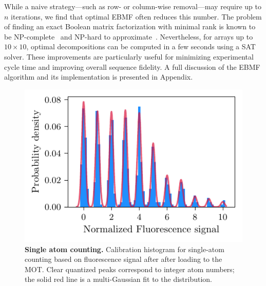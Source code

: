 While a naive strategy—such as row- or column-wise removal—may require up to $n$ iterations, we find that optimal EBMF often reduces this number. The problem of finding an exact Boolean matrix factorization with minimal rank is known to be NP-complete~\cite{orlin_contentment_1977} and NP-hard to approximate~\cite{gruber_inapproximability_2007}. Nevertheless, for arrays up to $10 \times 10$, optimal decompositions can be computed in a few seconds using a SAT solver. These improvements are particularly useful for minimizing experimental cycle time and improving overall sequence fidelity. A full discussion of the EBMF algorithm and its implementation is presented in Appendix.



\begin{figure}
    \centering
    \includegraphics{fig-py/atom-counting.pdf}
    \caption[Single atom counting]{
        \textbf{Single atom counting.}
        Calibration histogram for single-atom counting based on fluorescence signal after after loading to the MOT. Clear quantized peaks correspond to integer atom numbers; the solid red line is a multi-Gaussian fit to the distribution. 
    }
    \label{fig:spillingadd}
\end{figure}